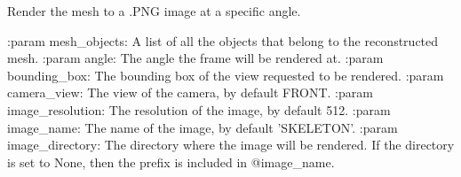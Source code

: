 \begin{DoxyVerb}Render the mesh to a .PNG image at a specific angle.

:param mesh_objects:
    A list of all the objects that belong to the reconstructed mesh.
:param angle:
    The angle the frame will be rendered at.
:param bounding_box:
    The bounding box of the view requested to be rendered.
:param camera_view:
    The view of the camera, by default FRONT.
:param image_resolution:
    The resolution of the image, by default 512.
:param image_name:
    The name of the image, by default 'SKELETON'.
:param image_directory:
    The directory where the image will be rendered. If the directory is set to None,
    then the prefix is included in @image_name.
\end{DoxyVerb}
